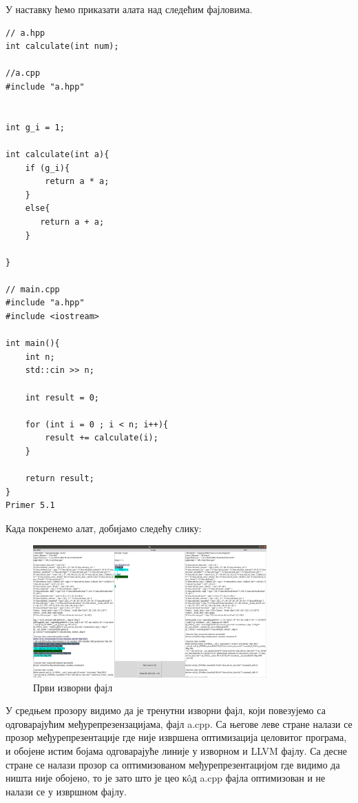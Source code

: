 \documentclass[12pt,oneside]{memoir}
\begin{document}
У наставку ћемо приказати  алата над следећим фајловима.

\begin{lstlisting}[frame=single]
// a.hpp
int calculate(int num);

//a.cpp
#include "a.hpp"


int g_i = 1;

int calculate(int a){
    if (g_i){
        return a * a;
    }
    else{
       return a + a;
    }
    
}

// main.cpp
#include "a.hpp"
#include <iostream>

int main(){
    int n;
    std::cin >> n;
    
    int result = 0;

    for (int i = 0 ; i < n; i++){
        result += calculate(i);
    }

    return result;
}
Primer 5.1

\end{lstlisting}

Када покренемо алат, добијамо следећу слику:

\begin{figure}[!ht]
  \centering
  \includegraphics[width=0.8\textwidth]{a_cpp.png}
  \caption{Први изворни фајл }
  \label{fig:grafikon}
\end{figure}

У средњем прозору видимо да је тренутни изворни фајл, који повезујемо са одговарајућим
међурепрезензацијама, фајл a.cpp.
Са његове леве стране налази се прозор међурепрезентације где није извршена оптимизација
целовитог програма, и обојене истим бојама одговарајуће линије у изворном и
LLVM фајлу.
Са десне стране се налази прозор са оптимизованом међурепрезентацијом где видимо
да ништа није обојено, то је зато што је цео к\^{o}д  a.cpp фајла оптимизован
и не налази се у извршном фајлу.
\end{document}
